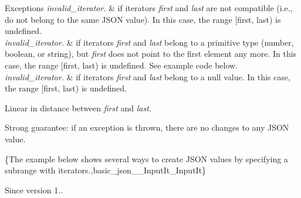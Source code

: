 \begin{DoxyExceptions}{Exceptions}
{\em invalid\+\_\+iterator.} & if iterators {\itshape first} and {\itshape last} are not compatible (i.\+e., do not belong to the same J\+S\+ON value). In this case, the range {\ttfamily \mbox{[}first, last)} is undefined. \\
\hline
{\em invalid\+\_\+iterator.} & if iterators {\itshape first} and {\itshape last} belong to a primitive type (number, boolean, or string), but {\itshape first} does not point to the first element any more. In this case, the range {\ttfamily \mbox{[}first, last)} is undefined. See example code below. \\
\hline
{\em invalid\+\_\+iterator.} & if iterators {\itshape first} and {\itshape last} belong to a null value. In this case, the range {\ttfamily \mbox{[}first, last)} is undefined.\\
\hline
\end{DoxyExceptions}
Linear in distance between {\itshape first} and {\itshape last}.

Strong guarantee\+: if an exception is thrown, there are no changes to any J\+S\+ON value.

\{The example below shows several ways to create J\+S\+ON values by specifying a subrange with iterators.,basic\+\_\+json\+\_\+\+\_\+\+Input\+It\+\_\+\+Input\+It\}

\begin{DoxySince}{Since}
version 1.. 
\end{DoxySince}
\mbox{\label{classnlohmann_1_1basic__json_af5de621bcf646c332343f9c1e011126c}} 
